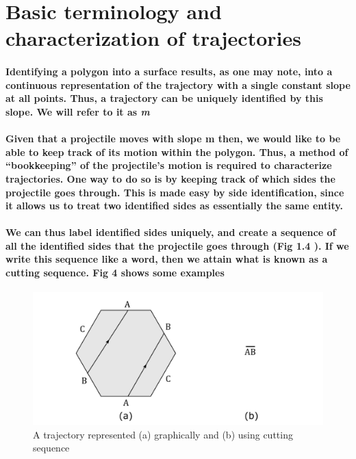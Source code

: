 \documentclass{report}
\begin{document}
\section{Basic terminology and characterization of trajectories}
\paragraph{Identifying a polygon into a surface results, as one may note, into a continuous representation of the trajectory with a single constant slope at all points. Thus, a trajectory can be uniquely identified by this slope. We will refer to it as \textit{m}}

\paragraph{Given that a projectile moves with slope m then, we would like to be able to keep track of its motion within the polygon. Thus, a method of “bookkeeping” of the projectile’s motion is required to characterize trajectories. One way to do so is by keeping track of which sides the projectile goes through. This is made easy by side identification, since it allows us to treat two identified sides as essentially the same entity.}

\paragraph{We can thus label identified sides uniquely, and create a sequence of all the identified sides that the projectile goes through (Fig 1.4 ). If we write this sequence like a word, then we attain what is known as a cutting sequence. Fig 4 shows some examples}

\begin{center}
\begin{figure} 
\includegraphics[scale=0.3]{4}
\caption{A trajectory represented (a) graphically and (b) using cutting sequence}
\end{figure}
\end{center}
\end{document}
